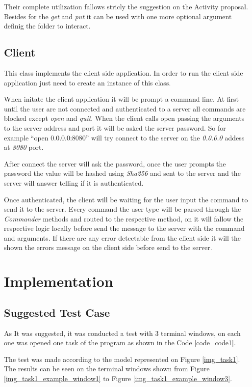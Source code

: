 \documentclass[a4paper, 11pt]{article}
\renewcommand*{\i}{\textit}
\begin{document}
Their complete utilization fallows stricly the suggestion on the Activity proposal. Besides for the \i{get} and \i{put} it can be used with one more optional argument definig the folder to interact.

\subsection{Client}

This class implements the client side application. In order to run the client side application just need to create an instance of this class.

When initate the client application it will be prompt a command line. At first until the user are not connected and authenticated to a server all commands are blocked except \i{open} and \i{quit}. When the client calls open passing the arguments to the server address and port it will be asked the server password. So for example ``open 0.0.0.0:8080'' will try connect to the server on the \i{0.0.0.0} addess at \i{8080} port.

After connect the server will ask the password, once the user prompts the password the value will be hashed using \i{Sha256} and sent to the server and the server will answer telling if it is authenticated.

Once authenticated, the client will be waiting for the user input the command to send it to the server. Every command the user type will be parsed through the \i{Commander} methods and routed to the respective method, on it will fallow the respective logic locally before send the message to the server with the command and arguments. If there are any error detectable from the client side it will the shown the errors message on the client side before send to the server.

\section*{Implementation}

\subsection*{Suggested Test Case}

As It was suggested, it was conducted a test with 3 terminal windows, on each one was opened one task of the program as shown in the Code \ref{code_code1}.

The test was made according to the model represented on Figure \ref{img_task1}. The results can be seen on the terminal windows shown from Figure \ref{img_task1_example_window1} to Figure \ref{img_task1_example_window3}.
\end{document}
